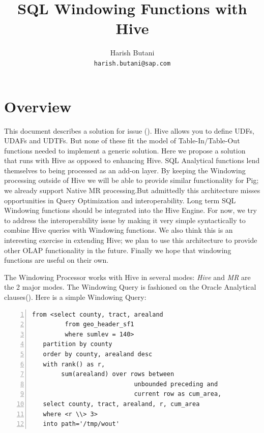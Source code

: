 \documentclass[pdftex,10pt,a4paper]{article}
\begin{document}
  \title{SQL Windowing Functions with Hive}
  \author{Harish Butani \\
  \texttt{harish.butani@sap.com}}
  \maketitle

  \section{Overview}
This document describes a solution for issue (\cite{hive1}). Hive
allows you to define UDFs, UDAFs and UDTFs. But none of these fit the
model of Table-In/Table-Out functions needed to implement a generic
solution. Here we propose a solution that runs with Hive as opposed
to enhancing Hive. SQL Analytical functions lend themselves to being
processed as an add-on layer. By keeping the Windowing processing
outside of Hive we will be able to provide similar functionality for
Pig; we already support Native MR processing.But admittedly this
architecture misses opportunities in Query Optimization and
interoperability. Long term SQL Windowing functions should be integrated into
the Hive Engine. For now, we try to address the interoperability issue by
making it very simple syntactically to combine Hive queries with Windowing
functions. We also think this is an interesting exercise in extending
Hive; we plan to use this architecture to provide other OLAP
functionality in the future. Finally we hope that windowing functions
are useful on their own.

The Windowing Processor works with Hive in several modes: {\em Hive}
and {\em MR} are the 2 major modes. The Windowing Query is fashioned
on the Oracle Analytical clauses(\cite{odoc}). Here is a simple Windowing Query:
  {\small
   \lstset{keywordstyle=\bfseries\underbar, emphstyle=\underbar,
     language=SQL, showspaces=false, showstringspaces=false}
  \label{qry1}
   \begin{lstlisting}[caption={A simple Windowing Query},frame=shadowbox, numbers=left]
   from <select county, tract, arealand 
         from geo_header_sf1 
         where sumlev = 140>
   partition by county
   order by county, arealand desc
   with rank() as r,
        sum(arealand) over rows between 
                            unbounded preceding and 
                            current row as cum_area,
   select county, tract, arealand, r, cum_area
   where <r \\> 3>
   into path='/tmp/wout' 
   \end{lstlisting}
   }
\end{document}
